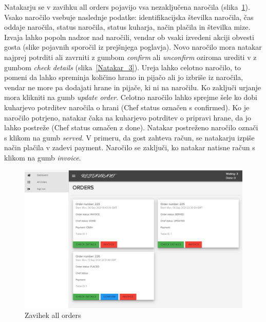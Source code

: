 \documentclass[a4paper, 12pt]{book}
\begin{document}
Natakarju se v zavihku all orders pojavijo vsa nezaključena naročila (slika~\ref{Natakar_2}). Vsako naročilo vsebuje naslednje podatke: identifikacijska številka naročila, čas oddaje naročila, status naročila, status kuharja, način plačila in številka mize. Izvaja lahko popoln nadzor nad naročili, vendar ob vsaki izvedeni akciji obvesti gosta (slike pojavnih sporočil iz prejšnjega poglavja). Novo naročilo mora natakar najprej potrditi ali zavrniti z gumbom \textit{confirm} ali \textit{unconfirm} oziroma urediti v z gumbom \textit{check details} (slika~\ref{Natakar_3}). Ureja lahko celotno naročilo, to pomeni da lahko spreminja količino hrano in pijačo ali jo izbriše iz naročila, vendar ne more pa dodajati hrane in pijače, ki ni na naročilu. Ko zaključi urjanje mora klikniti na gumb \textit{update order}. Celotno naročilo lahko sprejme šele ko dobi kuharjevo potrditev naročila o hrani (Chef status označen s confirmed). Ko je naročilo potrjeno, natakar čaka na kuharjevo potrditev o pripravi hrane, da jo lahko postreže (Chef status označen z done). Natakar postreženo naročilo označi s klikom na gumb \textit{served}. V primeru, da gost zahteva račun, se natakarju izpiše način plačila v zadevi payment. Naročilo se zaključi, ko natakar natisne račun s klikom na gumb \textit{invoice}.

\begin{figure}[!htb]
\begin{center}
\includegraphics[width=13cm]{natakar_2.jpg}
\caption{Zavihek all orders}
\label{Natakar_2}
\end{center}
\end{figure}
\end{document}
